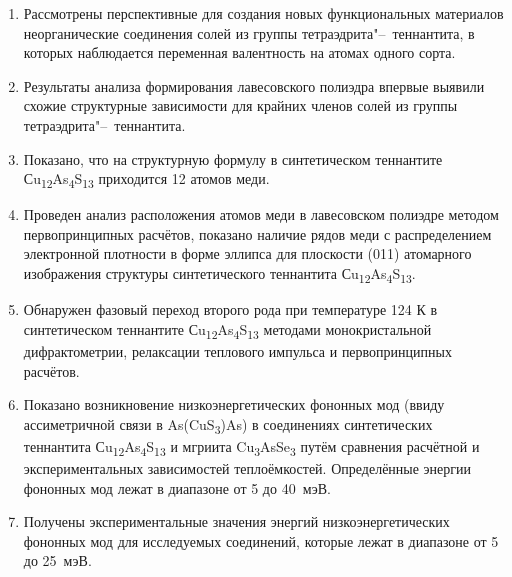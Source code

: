 \begin{enumerate}
						\item Рассмотрены перспективные для создания новых функциональных материалов неорганические соединения солей из группы тетраэдрита"--~теннантита, в которых наблюдается переменная валентность на атомах одного сорта.
						\item Результаты анализа формирования лавесовского полиэдра впервые выявили схожие структурные зависимости для крайних членов солей из группы тетраэдрита"--~теннантита.
						\item Показано, что на структурную формулу в синтетическом теннантите Сu\textsubscript{12}As\textsubscript{4}S\textsubscript{13} приходится 12 атомов меди.
						\item Проведен анализ расположения атомов меди в лавесовском полиэдре методом первопринципных расчётов, показано наличие рядов меди с распределением электронной плотности в форме эллипса для плоскости (011) атомарного изображения структуры синтетического теннантита Сu\textsubscript{12}As\textsubscript{4}S\textsubscript{13}.
						\item Обнаружен фазовый переход второго рода при температуре 124 К в синтетическом теннантите Сu\textsubscript{12}As\textsubscript{4}S\textsubscript{13} методами монокристальной дифрактометрии, релаксации теплового импульса и  первопринципных расчётов.
						\item Показано возникновение низкоэнергетических фононных мод (ввиду  ассиметричной связи в As(CuS\textsubscript{3})As) в соединениях синтетических теннантита Сu\textsubscript{12}As\textsubscript{4}S\textsubscript{13} и мгриита Cu\textsubscript{3}AsSe\textsubscript{3} путём сравнения расчётной и экспериментальных зависимостей теплоёмкостей. Определённые энергии  фононных мод  лежат в диапазоне от 5 до 40~мэВ.
						\item Получены экспериментальные значения энергий низкоэнергетических фононных мод для исследуемых соединений, которые лежат в диапазоне от 5 до 25~мэВ.

\end{enumerate}
